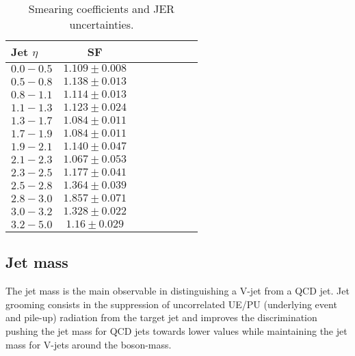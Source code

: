 \begin{table}[!htb]
  \centering
  \begin{tabular}{l|ccccccc}
    Jet $\eta$ & SF \\
    \hline
    $0.0-0.5$ & $1.109 \pm 0.008$ \\
    $0.5-0.8$ & $1.138 \pm 0.013$ \\
    $0.8-1.1$ & $1.114 \pm 0.013$ \\
    $1.1-1.3$ & $1.123 \pm 0.024$ \\
    $1.3-1.7$ & $1.084 \pm 0.011$ \\
    $1.7-1.9$ & $1.084 \pm 0.011$ \\
    $1.9-2.1$ & $1.140 \pm 0.047$ \\
    $2.1-2.3$ & $1.067 \pm 0.053$ \\
    $2.3-2.5$ & $1.177 \pm 0.041$ \\
    $2.5-2.8$ & $1.364 \pm 0.039$ \\
    $2.8-3.0$ & $1.857 \pm 0.071$ \\
    $3.0-3.2$ & $1.328 \pm 0.022$ \\
    $3.2-5.0$ & $1.16  \pm 0.029$ \\
  \end{tabular}
  
  \caption{Smearing coefficients and JER uncertainties.}
  \label{tab:smear}
\end{table}

\clearpage
\subsection{Jet mass}\label{ssec:jetmass}

The jet mass is the main observable in distinguishing a V-jet from a QCD jet. Jet grooming consists in the suppression of uncorrelated UE/PU (underlying event and pile-up) radiation from the target jet and improves the discrimination pushing the jet mass for QCD jets towards lower values while maintaining the jet mass for V-jets around the boson-mass.

